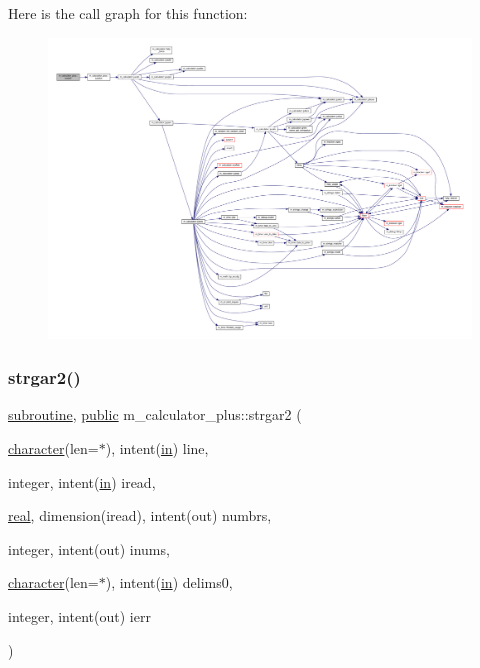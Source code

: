 Here is the call graph for this function\+:
\nopagebreak
\begin{figure}[H]
\begin{center}
\leavevmode
\includegraphics[width=350pt]{namespacem__calculator__plus_a2538e7f9f0b810f7f8dbdd80fa2444b3_cgraph}
\end{center}
\end{figure}
\mbox{\label{namespacem__calculator__plus_a59710eb6babeed1f4b8d439f97d5d90a}} 
\subsubsection{\texorpdfstring{strgar2()}{strgar2()}}
{\footnotesize\ttfamily \hyperlink{M__stopwatch_83_8txt_acfbcff50169d691ff02d4a123ed70482}{subroutine}, \hyperlink{M__stopwatch_83_8txt_a2f74811300c361e53b430611a7d1769f}{public} m\+\_\+calculator\+\_\+plus\+::strgar2 (\begin{DoxyParamCaption}\item[{\hyperlink{option__stopwatch_83_8txt_abd4b21fbbd175834027b5224bfe97e66}{character}(len=$\ast$), intent(\hyperlink{M__journal_83_8txt_afce72651d1eed785a2132bee863b2f38}{in})}]{line,  }\item[{integer, intent(\hyperlink{M__journal_83_8txt_afce72651d1eed785a2132bee863b2f38}{in})}]{iread,  }\item[{\hyperlink{read__watch_83_8txt_abdb62bde002f38ef75f810d3a905a823}{real}, dimension(iread), intent(out)}]{numbrs,  }\item[{integer, intent(out)}]{inums,  }\item[{\hyperlink{option__stopwatch_83_8txt_abd4b21fbbd175834027b5224bfe97e66}{character}(len=$\ast$), intent(\hyperlink{M__journal_83_8txt_afce72651d1eed785a2132bee863b2f38}{in})}]{delims0,  }\item[{integer, intent(out)}]{ierr }\end{DoxyParamCaption})}



